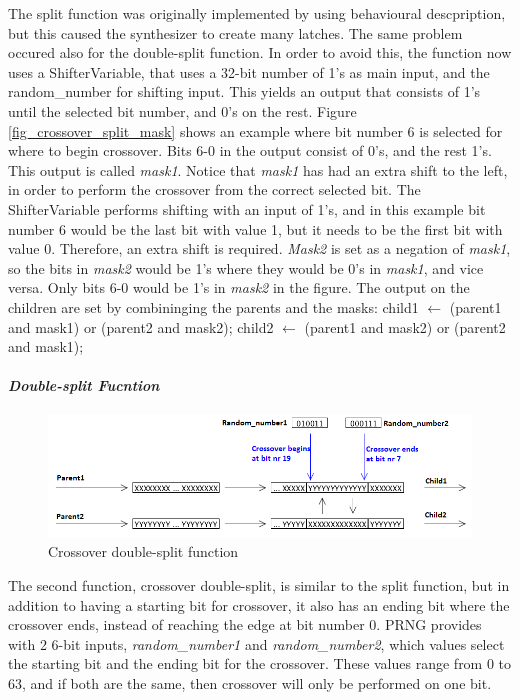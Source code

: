 The split function was originally implemented by using behavioural descpription, but this caused the synthesizer to create many latches.
The same problem occured also for the double-split function.
In order to avoid this, the function now uses a ShifterVariable, that uses a 32-bit number of 1's as main input, and the random\_number for shifting input.
This yields an output that consists of 1's until the selected bit number, and 0's on the rest.
Figure \ref{fig_crossover_split_mask} shows an example where bit number 6 is selected for where to begin crossover. 
Bits 6-0 in the output consist of 0's, and the rest 1's.
This output is called \emph{mask1}. Notice that \emph{mask1} has had an extra shift to the left, in order to perform the crossover from the correct selected bit. 
The ShifterVariable performs shifting with an input of 1's, and in this example bit number 6 would be the last bit with value 1, but it needs to be the first bit with value 0. Therefore, an extra shift is required.
\emph{Mask2} is set as a negation of \emph{mask1}, so the bits in \emph{mask2} would be 1's where they would be 0's in \emph{mask1}, and vice versa.
Only bits 6-0 would be 1's in \emph{mask2} in the figure.
The output on the children are set by combininging the parents and the masks:
\linebreak
\linebreak child1 $\leftarrow$ (parent1 and mask1) or (parent2 and mask2);
\linebreak child2 $\leftarrow$ (parent1 and mask2) or (parent2 and mask1);

\paragraph{\textit{Double-split Fucntion}}
\begin{figure}[H]
\includegraphics[width=\textwidth]{fpga/fig/crossover_doublesplit.png}
\caption{Crossover double-split function}
\label{fig_crossover_doublesplit}
\end{figure}

The second function, crossover double-split, is similar to the split function, but in addition to having a starting bit for crossover, it also has an ending bit where the crossover ends, instead of reaching the edge at bit number 0.
PRNG provides with 2 6-bit inputs, \emph{random\_number1} and \emph{random\_number2}, which values select the starting bit and the ending bit for the crossover.
These values range from 0 to 63, and if both are the same, then crossover will only be performed on one bit.

